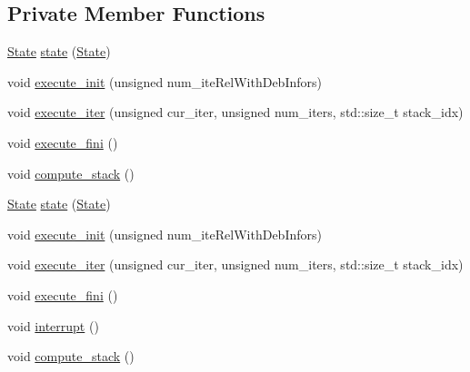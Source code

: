 \subsection*{Private Member Functions}
\begin{DoxyCompactItemize}
\item 
\hyperlink{classecto_1_1scheduler_a6b063d1c4bb9dad58d7ace61946b1200}{State} \hyperlink{classecto_1_1scheduler_a04cb7ea1040fcb02f5c843ca33ffa1a6}{state} (\hyperlink{classecto_1_1scheduler_a6b063d1c4bb9dad58d7ace61946b1200}{State})
\item 
void \hyperlink{classecto_1_1scheduler_adc21b65d6b046032648161c16ca89f77}{execute\-\_\-init} (unsigned num\-\_\-ite\-Rel\-With\-Deb\-Infors)
\item 
void \hyperlink{classecto_1_1scheduler_ae96db9aa735b4aec8eda6c1ea5616b95}{execute\-\_\-iter} (unsigned cur\-\_\-iter, unsigned num\-\_\-iters, std\-::size\-\_\-t stack\-\_\-idx)
\item 
void \hyperlink{classecto_1_1scheduler_abab4de26974143a076ac532ffac4f67f}{execute\-\_\-fini} ()
\item 
void \hyperlink{classecto_1_1scheduler_ad922a0a31e48a09ae6b6a95a4a1a20e5}{compute\-\_\-stack} ()
\item 
\hyperlink{classecto_1_1scheduler_a6b063d1c4bb9dad58d7ace61946b1200}{State} \hyperlink{classecto_1_1scheduler_a7620d82ec37d2d8da7a4526df6f97083}{state} (\hyperlink{classecto_1_1scheduler_a6b063d1c4bb9dad58d7ace61946b1200}{State})
\item 
void \hyperlink{classecto_1_1scheduler_adc21b65d6b046032648161c16ca89f77}{execute\-\_\-init} (unsigned num\-\_\-ite\-Rel\-With\-Deb\-Infors)
\item 
void \hyperlink{classecto_1_1scheduler_ae96db9aa735b4aec8eda6c1ea5616b95}{execute\-\_\-iter} (unsigned cur\-\_\-iter, unsigned num\-\_\-iters, std\-::size\-\_\-t stack\-\_\-idx)
\item 
void \hyperlink{classecto_1_1scheduler_abab4de26974143a076ac532ffac4f67f}{execute\-\_\-fini} ()
\item 
void \hyperlink{classecto_1_1scheduler_ae803a977a35883a6a0b8f83e7ba63d3c}{interrupt} ()
\item 
void \hyperlink{classecto_1_1scheduler_ad922a0a31e48a09ae6b6a95a4a1a20e5}{compute\-\_\-stack} ()
\end{DoxyCompactItemize}
